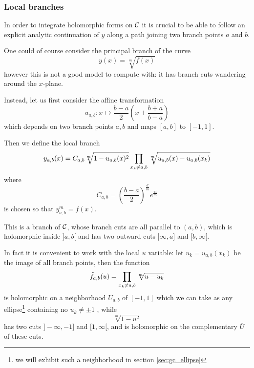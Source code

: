 \documentclass[main.tex]{subfiles}
\begin{document}
  \subsubsection{Local branches}

  In order to integrate holomorphic forms on $\mathcal{C}$
  it is crucial to be able to follow an explicit analytic continuation of $y$ along a
  path joining two branch points $a$ and $b$.

  One could of course consider the principal branch of the curve
  \begin{equation}
      y(x) = \sqrt[m]{f(x)}
  \end{equation}
  however this is not a good model to compute with: it has branch cuts
  wandering around the $x$-plane.

  Instead, let us first consider the affine transformation
  \begin{equation}
      \label{def:uab}
      u_{a,b} : x \mapsto \frac{b-a}{2}\left(x+\frac{b+a}{b-a}\right)
  \end{equation}
  which depends on two branch points $a,b$ and maps $[a,b]$ to $[-1,1]$.

  Then we define the local branch
  \begin{equation}
      \label{def:yab}
      y_{a,b}(x) =   C_{a,b} \sqrt[m]{1 - u_{a,b}(x)^2}
      \prod_{x_k\neq a,b}\sqrt[m]{u_{a,b}(x)-u_{a,b}(x_k)}
  \end{equation}
  where
  \begin{equation}
      C_{a,b} = \left(\frac{b-a}{2}\right)^{\frac{d}{m}} e^{\frac{\pi i}{m}}
  \end{equation}
  is chosen so that $y_{a,b}^m = f(x)$.

  This is a branch of $\mathcal{C}$, whose branch cuts are all parallel to $(a,b)$,
  which is holomorphic inside $]a,b[$ and has two outward cuts $]\infty, a]$ and $[b,\infty[$.

  In fact it is convenient to work with the local $u$ variable: let $u_k = u_{a,b}(x_k)$ be the image
  of all branch points, then the function
  \begin{equation}
      \tilde{f}_{a,b}(u) = \prod_{x_k \ne a,b} \sqrt[m]{u - u_k}
  \end{equation}
  is holomorphic on a neighborhood $U_{a,b}$ of $[-1,1]$ which we can take as
  any ellipse\footnote{we will exhibit such a neighborhood in section \ref{sec:gc_ellipse}}
  containing no $u_k\neq\pm1$ , while
  \begin{equation}
      \sqrt[m]{1-u^2}
  \end{equation}
  has two cuts $]-\infty,-1]$ and $[1,\infty[$, and is holomorphic on the complementary
  $\overline U$ of these cuts.
\end{document}
